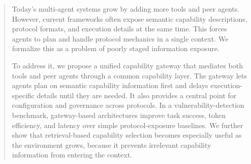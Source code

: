 \begin{abstract}

Today's multi-agent systems grow by adding more tools and peer agents.
However, current frameworks often expose semantic capability descriptions, protocol formats, and execution details at the same time.
This forces agents to plan and handle protocol mechanics in a single context.
We formalize this as a problem of poorly staged information exposure.

To address it, we propose a unified capability gateway that mediates both tools and peer agents through a common capability layer.
The gateway lets agents plan on semantic capability information first and delays execution-specific details until they are needed.
It also provides a central point for configuration and governance across protocols.
In a vulnerability-detection benchmark, gateway-based architectures improve task success, token efficiency, and latency over simple protocol-exposure baselines.
We further show that retrieval-based capability selection becomes especially useful as the environment grows, because it prevents irrelevant capability information from entering the context.

\end{abstract}
